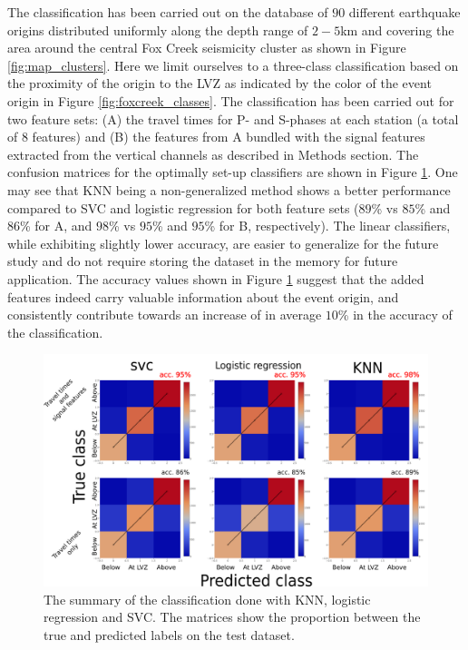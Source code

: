 \documentclass[letterpaper,11pt]{article}
\begin{document}
The classification has been carried out on the database of $90$ different earthquake origins distributed uniformly along the depth range of $2-5$km and covering the area around the central Fox Creek seismicity cluster as shown in Figure \ref{fig:map_clusters}. Here we limit ourselves to a three-class classification based on the proximity of the origin to the \textsc{LVZ} as indicated by the color of the event origin in Figure \ref{fig:foxcreek_classes}.
The classification has been carried out for two feature sets: (A) the travel times for P- and S-phases at each station (a total of $8$ features) and (B) the features from A bundled with the signal features extracted from the vertical channels as described in Methods section. The confusion matrices for the optimally set-up classifiers are shown in Figure \ref{fig:confusion}. One may see that \textsc{KNN} being a non-generalized method shows a better performance compared to \textsc{SVC} and logistic regression for both feature sets ($89$\% vs $85$\% and $86$\% for A, and $98$\% vs $95$\% and $95$\% for B, respectively). The linear classifiers, while exhibiting slightly lower accuracy, are easier to generalize for the future study and do not require storing the dataset in the memory for future application.
The accuracy values shown in Figure \ref{fig:confusion} suggest that the added features indeed carry valuable information about the event origin, and consistently contribute towards an increase of in average $10$\% in the accuracy of the classification.
\begin{figure}[htb]
\begin{center}
\includegraphics[width=0.5\linewidth,angle=0]{./AntonBiryukov_bibtex/Figure_confusion_horiz.png}
\end{center}
\vspace{-4mm}
\caption{The summary of the classification done with \textsc{KNN}, logistic regression and \textsc{SVC}. The matrices show the proportion between the true and predicted labels on the test dataset.}
\label{fig:confusion}
\end{figure}
\end{document}
